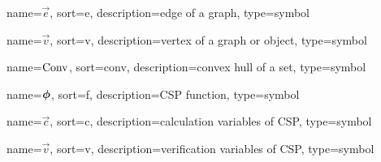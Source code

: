 	{%
		name=\ensuremath{\vec{e}},
		sort=e,
		description=edge of a graph,
		type=symbol
	}
	\newcommand{\edge}{\gls{sym:edge}}

	{%
		name=\ensuremath{\vec{v}},
		sort=v,
		description=vertex of a graph or object,
		type=symbol
	}
	\newcommand{\vertex}{\gls{sym:vertex}}

	{%
		name=\ensuremath{\func{Conv}},
		sort=conv,
		description=convex hull of a set,
		type=symbol
	}
	\newcommand{\convexhull}{\gls{sym:convexhull}}


	{%
		name=\ensuremath{\vecfunc{\phi}},
		sort=f,
		description=CSP function,
		type=symbol
	}
	\newcommand{\cspfunc}{\gls{sym:cspfunc}}

	{%
		name=\ensuremath{\vec{c}},
		sort=c,
		description=calculation variables of CSP,
		type=symbol
	}
	\newcommand{\calcvars}{\gls{sym:calcvars}}

	{%
		name=\ensuremath{\vec{v}},
		sort=v,
		description=verification variables of CSP,
		type=symbol
	}
	\newcommand{\vervars}{\gls{sym:vervars}}


